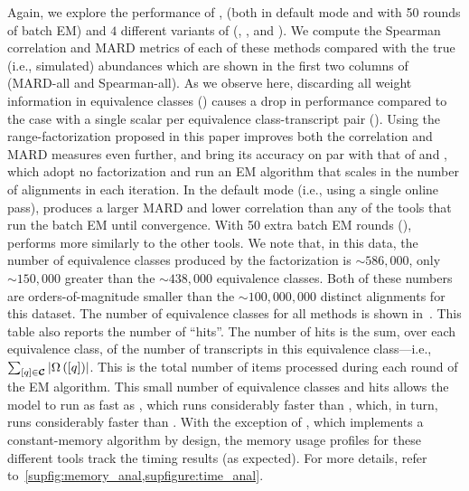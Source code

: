 Again, we explore the performance of \rsem, \express (both in default mode 
and with 50 rounds of batch EM) and $4$ different variants of \salmon
(\salmonu, \salmon, \salmonrf and \salmonfm). We compute the Spearman
correlation and MARD metrics of each of these methods compared with the true
(i.e., simulated) abundances which are shown in the first two columns of~ 
(MARD-all and Spearman-all). As we observe here, discarding all weight information in 
equivalence classes (\salmonu) causes a drop in performance compared to the case 
with a single scalar per equivalence class-transcript pair (\salmon). Using the 
range-factorization proposed in this paper improves both the correlation and 
MARD measures even further, and bring its accuracy on par with that 
of \rsem and \salmonfm, which adopt no factorization and run an EM algorithm that 
scales in the number of alignments in each iteration. In the default mode 
(i.e., using a single online pass), \express produces a larger MARD and lower 
correlation than any of the tools that run the batch EM until convergence. With 50 
extra batch EM rounds (\expressEM), \express performs more similarly to the other tools. 
We note that, in this data, the number of equivalence classes produced by the \rangebased
factorization is $\sim586,000$, only $\sim150,000$ greater than the
$\sim438,000$ \cb equivalence classes. Both of these numbers are
orders-of-magnitude smaller than the $\sim100,000,000$ distinct alignments for
this dataset. The number of equivalence classes for all
methods is shown in~. This table also reports the
number of ``hits''. The number of hits is the sum, over each equivalence class,
of the number of transcripts in this equivalence class---i.e.,
$\sum_{\left[q\right] \in \bm{\mathcal{C}}} \left|\Omega\left(\left[q\right]\right)\right|$. This is
the total number of items processed during each round of the EM algorithm. This
small number of equivalence classes and hits allows the \salmonrf model to run
as fast as \salmon, which runs considerably faster than \salmonfm, which, in
turn, runs considerably faster than \rsem. With the exception of \express, which
implements a constant-memory algorithm by design, the memory usage profiles for
these different tools track the timing results (as expected). For more details, 
refer to~\cref{supfig:memory_anal,supfigure:time_anal}.


